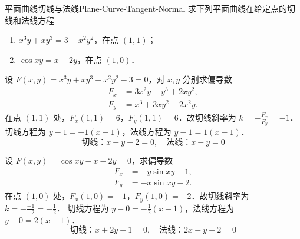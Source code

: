 \begin{problem}{平面曲线切线与法线}{Plane-Curve-Tangent-Normal}
    求下列平面曲线在给定点的切线和法线方程
    \begin{enumerate}
        \item $x^3y + xy^3 = 3 - x^2y^2$，在点 $(1, 1)$；
        \item $\cos xy = x + 2y$，在点 $(1, 0)$．
    \end{enumerate}
\end{problem}

\begin{solution}

    设 $F(x, y) = x^3y + xy^3 + x^2y^2 - 3 = 0$，对 $x, y$ 分别求偏导数
    \begin{equation}
        \label{eq:deriv-16-1}
        \begin{aligned}
            F_x & = 3x^2y + y^3 + 2xy^2, \\
            F_y & = x^3 + 3xy^2 + 2x^2y.
        \end{aligned}
    \end{equation}
    在点 $(1, 1)$ 处，$F_x(1, 1) = 6$，$F_y(1, 1) = 6$．故切线斜率为 $k = -\frac{F_x}{F_y} = -1$．
    切线方程为 $y - 1 = -1(x - 1)$，法线方程为 $y - 1 = 1(x - 1)$．
    \begin{equation}
        \boxed{\text{切线：} x + y - 2 = 0, \quad \text{法线：} x - y = 0}
    \end{equation}


    设 $F(x, y) = \cos xy - x - 2y = 0$，求偏导数
    \begin{equation}
        \label{eq:deriv-16-2}
        \begin{aligned}
            F_x & = -y \sin xy - 1, \\
            F_y & = -x \sin xy - 2.
        \end{aligned}
    \end{equation}
    在点 $(1, 0)$ 处，$F_x(1, 0) = -1$，$F_y(1, 0) = -2$．故切线斜率为 $k = -\frac{-1}{-2} = -\frac{1}{2}$．
    切线方程为 $y - 0 = -\frac{1}{2}(x - 1)$，法线方程为 $y - 0 = 2(x - 1)$．
    \begin{equation}
        \boxed{\text{切线：} x + 2y - 1 = 0, \quad \text{法线：} 2x - y - 2 = 0}
    \end{equation}
\end{solution}

